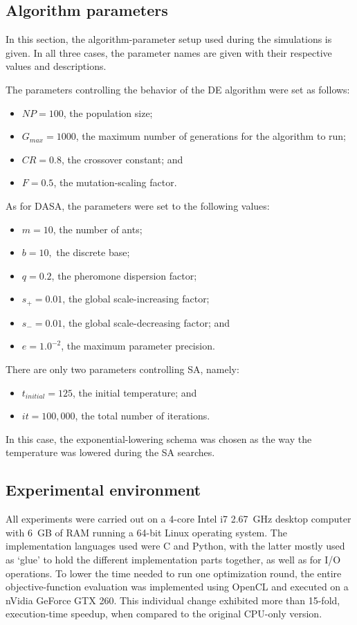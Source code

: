 \subsection{Algorithm parameters}

In this section, the algorithm-parameter setup used during the simulations
is given. In all three cases, the parameter names are given with their
respective values and descriptions.

The parameters controlling the behavior of the DE algorithm were set
as follows:
\begin{itemize}
\item $NP=100$, the population size;
\item $G_{max}=1000$, the maximum number of generations for the algorithm
to run;
\item $CR=0.8$, the crossover constant; and
\item $F=0.5$, the mutation-scaling factor.
\end{itemize}
As for DASA, the parameters were set to the following values:
\begin{itemize}
\item $m=10$, the number of ants;
\item $b=10,$ the discrete base;
\item $q=0.2$, the pheromone dispersion factor;
\item $s_{+}=0.01$, the global scale-increasing factor;
\item $s_{-}=0.01$, the global scale-decreasing factor; and 
\item $e=1.0^{-2}$, the maximum parameter precision.
\end{itemize}
There are only two parameters controlling SA, namely:
\begin{itemize}
\item $t_{initial}=125$, the initial temperature; and
\item $it=100,000$, the total number of iterations.
\end{itemize}
In this case, the exponential-lowering schema was chosen as the way
the temperature was lowered during the SA searches.


\subsection{Experimental environment}

All experiments were carried out on a 4-core Intel i7 2.67~GHz desktop
computer with 6~GB of RAM running a 64-bit Linux operating system.
The implementation languages used were C and Python, with the latter
mostly used as \textquoteleft{}glue\textquoteright{} to hold the different
implementation parts together, as well as for I/O operations. To lower
the time needed to run one optimization round, the entire objective-function
evaluation was implemented using OpenCL and executed on a nVidia GeForce
GTX 260. This individual change exhibited more than 15-fold, execution-time
speedup, when compared to the original CPU-only version.


